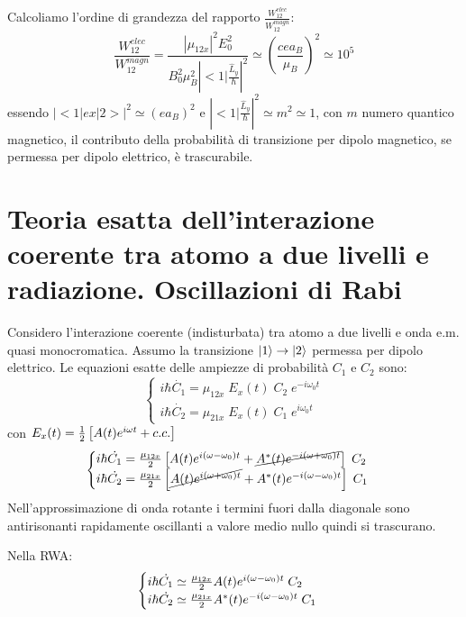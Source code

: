 \begin{enumerate}
    Calcoliamo l'ordine di grandezza del rapporto $\frac{W_{12}^{elec}}{W_{12}^{magn}}$:
    \begin{equation}
        \frac{W_{12}^{elec}}{W_{12}^{magn}} = \frac{|\mu_{12x}|^2 E_0^2}{B_0^2 \mu_B^2 \left| <1|\frac{\hat{L}_y}{\hbar}\right|^2} \simeq \left(\frac{c e a_B}{\mu_B}\right)^2 \simeq 10^5
    \end{equation}
    essendo $\left| <1| ex |2> \right|^2 \simeq (e a_B)^2$ e $\left| <1|\frac{\hat{L}_y}{\hbar}\right|^2 \simeq m^2 \simeq 1$, con $m$ numero quantico magnetico, il contributo della probabilità di transizione per dipolo magnetico, se permessa per dipolo elettrico, è trascurabile.
\end{enumerate}


\section{Teoria esatta dell'interazione coerente tra atomo a due livelli e radiazione. Oscillazioni di Rabi}

Considero l'interazione coerente (indisturbata) tra atomo a due livelli e onda e.m. quasi monocromatica.
Assumo la transizione $|1\rangle \rightarrow |2\rangle$ permessa per dipolo elettrico. Le equazioni esatte delle ampiezze di probabilità $C_1$ e $C_2$ sono:
\begin{equation}
    \begin{cases}
        i\hbar \dot{C_1} = \mu_{12x} \; E_x(t) \; C_2 \; e^{-i\omega_0 t}\\
        i\hbar \dot{C_2} = \mu_{21x} \; E_x(t) \; C_1 \; e^{i\omega_0 t}
    \end{cases}
\end{equation}
con $E_x(t) = \frac{1}{2} \left[ A(t) e^{i\omega t} + c.c. \right]$
\begin{equation}
    \begin{cases}
        i\hbar \dot{C_1} =  \frac{\mu_{12x}}{2} \left[ A(t) e^{i (\omega-\omega_0) t} + \cancel{A^*(t)e^{-i (\omega+\omega_0) t}} \right] \; C_2\\
        i\hbar \dot{C_2} =  \frac{\mu_{21x}}{2} \left[ \cancel{A(t) e^{i (\omega+\omega_0) t}} + A^*(t)e^{-i (\omega-\omega_0) t} \right] \; C_1
    \end{cases}
\end{equation}
Nell'approssimazione di onda rotante i termini fuori dalla diagonale sono antirisonanti rapidamente oscillanti a valore medio nullo quindi si trascurano.

Nella RWA:
\begin{equation}
    \begin{cases}
        i\hbar \dot{C_1} \simeq  \frac{\mu_{12x}}{2}A(t) e^{i (\omega-\omega_0) t} \; C_2\\
        i\hbar \dot{C_2} \simeq  \frac{\mu_{21x}}{2} A^*(t)e^{-i (\omega-\omega_0) t} \; C_1
    \end{cases}
\end{equation}

